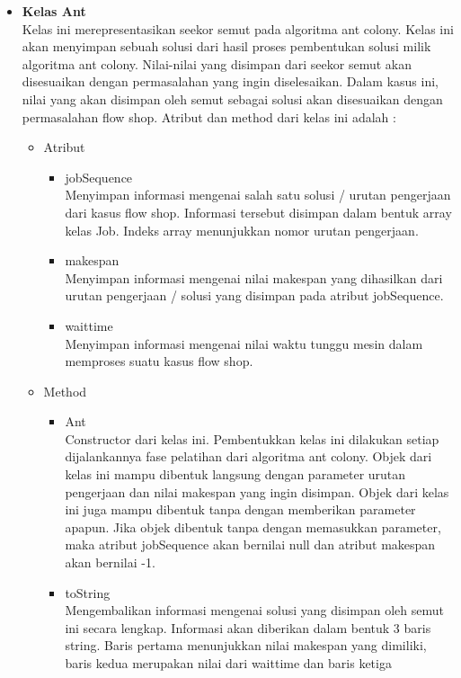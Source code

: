 \begin{itemize}
		\item \textbf{Kelas Ant}\\
		Kelas ini merepresentasikan seekor semut pada algoritma ant colony. Kelas ini akan menyimpan
		sebuah solusi dari hasil proses pembentukan solusi milik algoritma ant colony. Nilai-nilai
		yang disimpan dari seekor semut akan disesuaikan dengan permasalahan yang ingin diselesaikan.
		Dalam kasus ini, nilai yang akan disimpan oleh semut sebagai solusi akan disesuaikan
		dengan permasalahan flow shop. Atribut dan method dari kelas ini adalah :
		
		\begin{itemize}
			\item Atribut
			\begin{itemize}
				\item jobSequence \\
				Menyimpan informasi mengenai salah satu solusi / urutan pengerjaan dari kasus 
				flow shop. Informasi tersebut disimpan dalam bentuk array kelas Job. Indeks
				array menunjukkan nomor urutan pengerjaan.
				\item makespan \\
				Menyimpan informasi mengenai nilai makespan yang dihasilkan dari urutan pengerjaan
				/ solusi yang disimpan pada atribut jobSequence.
				\item waittime \\
				Menyimpan informasi mengenai nilai waktu tunggu mesin dalam memproses suatu kasus flow shop.
			\end{itemize}
			\item Method
			\begin{itemize}
				\item Ant \\
				Constructor dari kelas ini. Pembentukkan kelas ini dilakukan setiap dijalankannya
				fase pelatihan dari algoritma ant colony. Objek dari kelas ini mampu dibentuk langsung
				dengan parameter urutan pengerjaan dan nilai makespan yang ingin disimpan.
				Objek dari kelas ini juga mampu dibentuk tanpa dengan memberikan parameter 
				apapun. Jika objek dibentuk tanpa dengan memasukkan parameter, maka atribut
				jobSequence akan bernilai null dan atribut makespan akan bernilai -1.
				\item toString \\
				Mengembalikan informasi mengenai solusi yang disimpan oleh semut ini secara lengkap.
				Informasi akan diberikan dalam bentuk 3 baris string. Baris pertama menunjukkan
				nilai makespan yang dimiliki, baris kedua merupakan nilai dari waittime dan baris ketiga 

\end{itemize}
\end{itemize}
\end{itemize}
